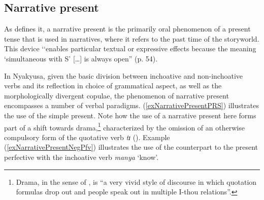 \subsection{Narrative present}\label{NarrativePresent}
As \citet[376]{FleischmanS1990} defines it, a narrative present is the primarily oral phenomenon of a present tense that is used in narratives, where it refers to the past time of the storyworld. This device \lq\lq enables particular textual or expressive effects because the meaning \lq simultaneous with S' [\ldots] is always open'' (p. 54). 

In Nyakyusa, given the basic division between inchoative and non-inchoative verbs and its reflection in choice of grammatical aspect, as well as the morphologically divergent copulae, the phenomenon of narrative present encompasses a number of verbal paradigms. (\ref{exNarrativePresentPRS}) illustrates the use of the simple present. Note how the use of a narrative present here forms part of a shift towards drama,\label{Drama}\footnote{\label{FNDrama}Drama, in the sense of \citet[43]{LongacreR1996}, is ``a very vivid style of discourse in which quotation formulas drop out and people speak out in multiple I-thou relations''.} characterized by the omission of an otherwise compulsory form of the quotative verb \textit{tɪ} (). Example (\ref{exNarrativePresentNegPfv}) illustrates the use of the  counterpart to the present perfective with the inchoative verb \textit{manya} \lq know'.

